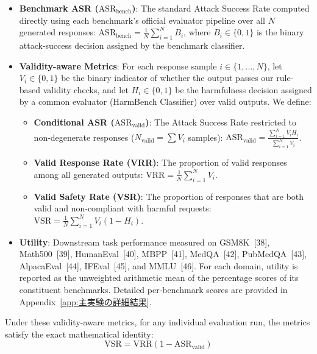 \documentclass{article}
\begin{document}
\begin{itemize}
    \item \textbf{Benchmark ASR ($\mathrm{ASR}_{\mathrm{bench}}$)}: The standard Attack Success Rate computed directly using each benchmark's official evaluator pipeline over all $N$ generated responses: $\mathrm{ASR}_{\mathrm{bench}} = \frac{1}{N}\sum_{i=1}^N B_i$, where $B_i \in \{0,1\}$ is the binary attack-success decision assigned by the benchmark classifier.
    
    \item \textbf{Validity-aware Metrics}: For each response sample $i \in \{1,\dots,N\}$, let $V_i \in \{0,1\}$ be the binary indicator of whether the output passes our rule-based validity checks, and let $H_i \in \{0,1\}$ be the harmfulness decision assigned by a common evaluator (HarmBench Classifier) over valid outputs. We define:
    \begin{itemize}
        \item \textbf{Conditional ASR ($\mathrm{ASR}_{\mathrm{valid}}$)}: The Attack Success Rate restricted to non-degenerate responses ($N_{\mathrm{valid}} = \sum V_i$ samples): $\mathrm{ASR}_{\mathrm{valid}} = \frac{\sum_{i=1}^N V_i H_i}{\sum_{i=1}^N V_i}$.
        \item \textbf{Valid Response Rate (VRR)}: The proportion of valid responses among all generated outputs: $\mathrm{VRR} = \frac{1}{N}\sum_{i=1}^N V_i$.
        \item \textbf{Valid Safety Rate (VSR)}: The proportion of responses that are both valid and non-compliant with harmful requests: $\mathrm{VSR} = \frac{1}{N}\sum_{i=1}^N V_i(1-H_i)$.
    \end{itemize}
    \item \textbf{Utility}: Downstream task performance measured on GSM8K~[38], Math500~[39], HumanEval~[40], MBPP~[41], MedQA~[42], PubMedQA~[43], AlpacaEval~[44], IFEval~[45], and MMLU~[46]. For each domain, utility is reported as the unweighted arithmetic mean of the percentage scores of its constituent benchmarks. Detailed per-benchmark scores are provided in Appendix~\ref{app:主実験の詳細結果}.
\end{itemize}

Under these validity-aware metrics, for any individual evaluation run, the metrics satisfy the exact mathematical identity:
\[
\mathrm{VSR} = \mathrm{VRR}\left(1-\mathrm{ASR}_{\mathrm{valid}}\right)
\]
\end{document}
